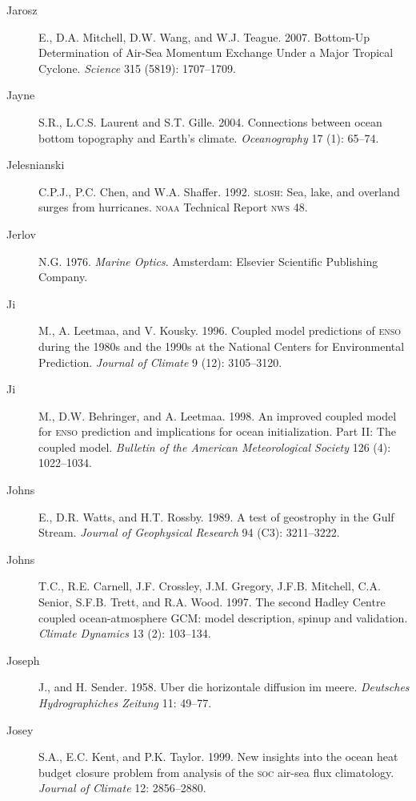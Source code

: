 \begin{description}
\item [Jarosz]E., D.A. Mitchell, D.W. Wang, and
  W.J. Teague. 2007. Bottom-Up Determination of Air-Sea Momentum
  Exchange Under a Major Tropical Cyclone. \textit{Science} 315
  (5819): 1707--1709.

\item [Jayne]S.R., L.C.S. Laurent and S.T. Gille. 2004. Connections
  between ocean bottom topography and Earth's
  climate. \textit{Oceanography} 17 (1): 65--74.

\item [Jelesnianski]C.P.J., P.C. Chen, and
  W.A. Shaffer. 1992. \textsc{slosh}: Sea, lake, and overland surges
  from hurricanes. \textsc{noaa} Technical Report \textsc{nws} 48.

\item[Jerlov]N.G. 1976. \textit{Marine Optics}. Amsterdam: Elsevier
  Scientific Publishing Company.

\item[Ji]M., A. Leetmaa, and V. Kousky. 1996. Coupled model
  predictions of \textsc{enso} during the 1980s and the 1990s at the
  National Centers for Environmental Prediction. \textit{Journal of
    Climate} 9 (12): 3105--3120.

\item[Ji]M., D.W. Behringer, and A. Leetmaa. 1998. An improved coupled
  model for \textsc{enso} prediction and implications for ocean
  initialization. Part II: The coupled model. \textit{Bulletin of the
    American Meteorological Society} 126 (4): 1022--1034.

\item [Johns]E., D.R. Watts, and H.T. Rossby. 1989. A test of
  geostrophy in the Gulf Stream. \textit{Journal of Geophysical
    Research} 94 (C3): 3211--3222.

\item [Johns]T.C., R.E. Carnell, J.F. Crossley, J.M. Gregory,
  J.F.B. Mitchell, C.A. Senior, S.F.B. Trett, and R.A. Wood. 1997. The
  second Hadley Centre coupled ocean-atmosphere GCM: model
  description, spinup and validation. \textit{Climate Dynamics} 13
  (2): 103--134.

\item[Joseph]J., and H. Sender. 1958. Uber die horizontale diffusion
  im meere.  \textit{Deutsches Hydrographiches Zeitung} 11: 49--77.

\item [Josey]S.A., E.C. Kent, and P.K. Taylor. 1999. New insights into
  the ocean heat budget closure problem from analysis of the
  \textsc{soc} air-sea flux climatology. \textit{Journal of Climate}
  12: 2856--2880.


\end{description}
